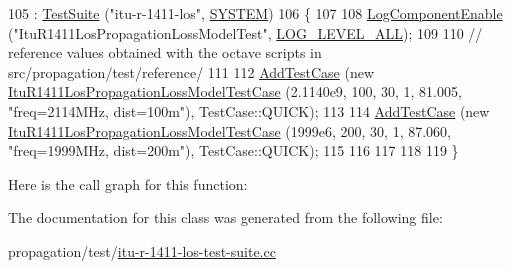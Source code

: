 \begin{DoxyCode}
105   : \hyperlink{classns3_1_1TestSuite_a904b0c40583b744d30908aeb94636d1a}{TestSuite} (\textcolor{stringliteral}{"itu-r-1411-los"}, \hyperlink{classns3_1_1TestSuite_a1ebfcab34ec8161e085e8e3a1855eae0a90c5529a26ab3a5ffcc6e57040dbd82e}{SYSTEM})
106 \{
107 
108   \hyperlink{namespacens3_adc4ef4f00bb2f5f4edae67fc3bc27f20}{LogComponentEnable} (\textcolor{stringliteral}{"ItuR1411LosPropagationLossModelTest"}, 
      \hyperlink{namespacens3_aa6464a4d69551a9cc968e17a65f39bdba022b1237a4fd1b08d034471df3c58586}{LOG\_LEVEL\_ALL});
109 
110   \textcolor{comment}{// reference values obtained with the octave scripts in src/propagation/test/reference/}
111 
112   \hyperlink{classns3_1_1TestCase_a3718088e3eefd5d6454569d2e0ddd835}{AddTestCase} (\textcolor{keyword}{new} \hyperlink{classItuR1411LosPropagationLossModelTestCase}{ItuR1411LosPropagationLossModelTestCase}
       (2.1140e9, 100, 30, 1,  81.005, \textcolor{stringliteral}{"freq=2114MHz, dist=100m"}), TestCase::QUICK);
113 
114   \hyperlink{classns3_1_1TestCase_a3718088e3eefd5d6454569d2e0ddd835}{AddTestCase} (\textcolor{keyword}{new} \hyperlink{classItuR1411LosPropagationLossModelTestCase}{ItuR1411LosPropagationLossModelTestCase}
       (1999e6, 200, 30, 1,  87.060, \textcolor{stringliteral}{"freq=1999MHz, dist=200m"}), TestCase::QUICK);
115 
116 
117 
118 
119 \}
\end{DoxyCode}


Here is the call graph for this function\+:




The documentation for this class was generated from the following file\+:\begin{DoxyCompactItemize}
\item 
propagation/test/\hyperlink{itu-r-1411-los-test-suite_8cc}{itu-\/r-\/1411-\/los-\/test-\/suite.\+cc}\end{DoxyCompactItemize}
